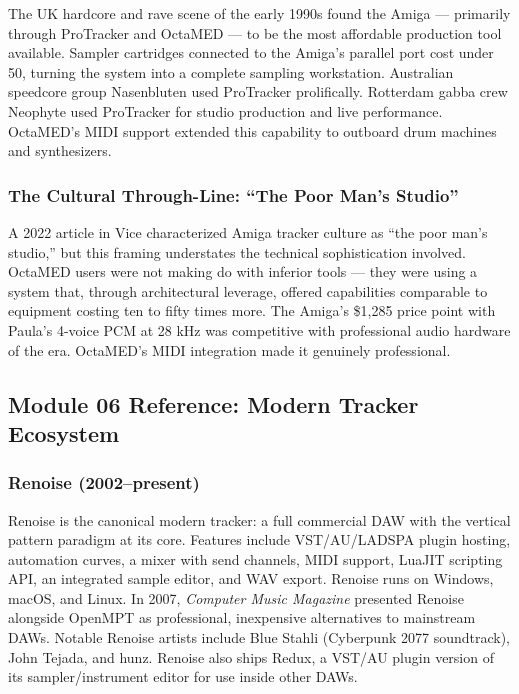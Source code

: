 \documentclass[11pt,letterpaper]{article}
\begin{document}
The UK hardcore and rave scene of the early 1990s found the Amiga --- primarily through ProTracker and OctaMED --- to be the most affordable production tool available. Sampler cartridges connected to the Amiga's parallel port cost under \textsterling{}50, turning the system into a complete sampling workstation. Australian speedcore group Nasenbluten used ProTracker prolifically. Rotterdam gabba crew Neophyte used ProTracker for studio production and live performance. OctaMED's MIDI support extended this capability to outboard drum machines and synthesizers.

\subsubsection{The Cultural Through-Line: ``The Poor Man's Studio''}

A 2022 article in Vice characterized Amiga tracker culture as ``the poor man's studio,'' but this framing understates the technical sophistication involved. OctaMED users were not making do with inferior tools --- they were using a system that, through architectural leverage, offered capabilities comparable to equipment costing ten to fifty times more. The Amiga's \$1,285 price point with Paula's 4-voice PCM at 28 kHz was competitive with professional audio hardware of the era. OctaMED's MIDI integration made it genuinely professional.

\subsection{Module 06 Reference: Modern Tracker Ecosystem}

\subsubsection{Renoise (2002--present)}

Renoise is the canonical modern tracker: a full commercial DAW with the vertical pattern paradigm at its core. Features include VST/AU/LADSPA plugin hosting, automation curves, a mixer with send channels, MIDI support, LuaJIT scripting API, an integrated sample editor, and WAV export. Renoise runs on Windows, macOS, and Linux. In 2007, \textit{Computer Music Magazine} presented Renoise alongside OpenMPT as professional, inexpensive alternatives to mainstream DAWs. Notable Renoise artists include Blue Stahli (Cyberpunk 2077 soundtrack), John Tejada, and hunz. Renoise also ships Redux, a VST/AU plugin version of its sampler/instrument editor for use inside other DAWs.
\end{document}
